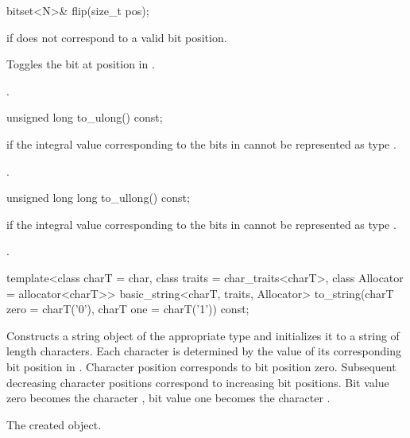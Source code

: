 %
\begin{itemdecl}
bitset<N>& flip(size_t pos);
\end{itemdecl}

\begin{itemdescr}
\pnum
\throws
{}
if  does not correspond to a valid bit position.%

\pnum
\effects
Toggles the bit at position  in
.

\pnum
\returns
{}.
\end{itemdescr}

%
\begin{itemdecl}
unsigned long to_ulong() const;
\end{itemdecl}

\begin{itemdescr}
\pnum
\throws
{}%
if the integral value  corresponding to the bits in
cannot be represented as type
.

\pnum
\returns
{}.
\end{itemdescr}

%
\begin{itemdecl}
unsigned long long to_ullong() const;
\end{itemdecl}

\begin{itemdescr}
\pnum
{}%
\throws
{}
if the integral value  corresponding to the bits in
cannot be represented as type
.

\pnum
\returns
{}.
\end{itemdescr}

%
\begin{itemdecl}
template<class charT = char,
         class traits = char_traits<charT>,
         class Allocator = allocator<charT>>
  basic_string<charT, traits, Allocator>
    to_string(charT zero = charT('0'), charT one = charT('1')) const;
\end{itemdecl}

\begin{itemdescr}
\pnum
\effects
Constructs a string object of the appropriate type
and initializes it to a string of length  characters.
Each character is determined by the value of its corresponding bit position in
.
Character position  corresponds to bit position zero.
Subsequent decreasing character positions correspond to increasing bit
positions.
Bit value zero becomes the character ,
bit value one becomes the character
.

\pnum
\returns
The created object.
\end{itemdescr}

